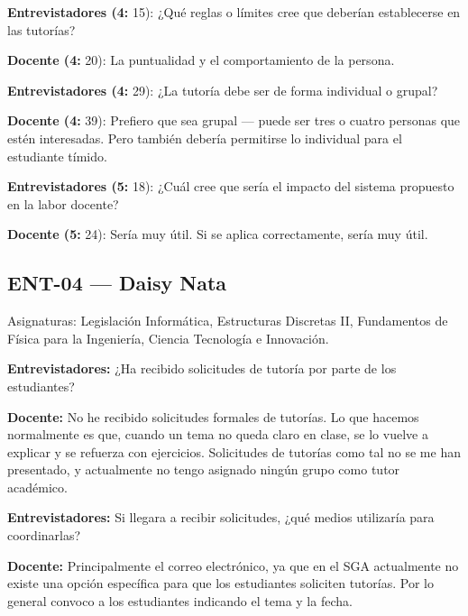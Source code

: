 \noindent\textbf{Entrevistadores (4:} 15): ¿Qué reglas o límites cree que deberían establecerse en las tutorías?\par\smallskip

\noindent\textbf{Docente (4:} 20): La puntualidad y el comportamiento de la persona.\par\smallskip

\noindent\textbf{Entrevistadores (4:} 29): ¿La tutoría debe ser de forma individual o grupal?\par\smallskip

\noindent\textbf{Docente (4:} 39): Prefiero que sea grupal — puede ser tres o cuatro personas que estén interesadas. Pero también debería permitirse lo individual para el estudiante tímido.\par\smallskip

\noindent\textbf{Entrevistadores (5:} 18): ¿Cuál cree que sería el impacto del sistema propuesto en la labor docente?\par\smallskip

\noindent\textbf{Docente (5:} 24): Sería muy útil. Si se aplica correctamente, sería muy útil.\par\smallskip

\subsection{ENT-04 — Daisy Nata}
\label{transcripcion:ent04}

Asignaturas: Legislación Informática, Estructuras Discretas II, Fundamentos de Física para la Ingeniería, Ciencia Tecnología e Innovación.\par\smallskip

\noindent\textbf{Entrevistadores:} ¿Ha recibido solicitudes de tutoría por parte de los estudiantes?\par\smallskip

\noindent\textbf{Docente:} No he recibido solicitudes formales de tutorías. Lo que hacemos normalmente es que, cuando un tema no queda claro en clase, se lo vuelve a explicar y se refuerza con ejercicios. Solicitudes de tutorías como tal no se me han presentado, y actualmente no tengo asignado ningún grupo como tutor académico.\par\smallskip

\noindent\textbf{Entrevistadores:} Si llegara a recibir solicitudes, ¿qué medios utilizaría para coordinarlas?\par\smallskip

\noindent\textbf{Docente:} Principalmente el correo electrónico, ya que en el SGA actualmente no existe una opción específica para que los estudiantes soliciten tutorías. Por lo general convoco a los estudiantes indicando el tema y la fecha.\par\smallskip

